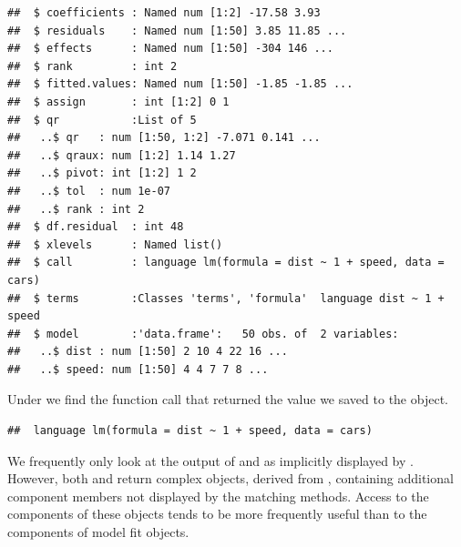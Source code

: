 \documentclass[krantz2]{krantz}\usepackage{knitr}
\begin{document}
\begin{explainbox}
\begin{knitrout}\footnotesize
{}\color{fgcolor}\begin{kframe}
\begin{alltt}
  \hlstd{=} \hlstd{,}  \hlstd{=} \hlstd{,}  \hlstd{=} \hlstd{)}
\end{alltt}
\begin{verbatim}
##  $ coefficients : Named num [1:2] -17.58 3.93
##  $ residuals    : Named num [1:50] 3.85 11.85 ...
##  $ effects      : Named num [1:50] -304 146 ...
##  $ rank         : int 2
##  $ fitted.values: Named num [1:50] -1.85 -1.85 ...
##  $ assign       : int [1:2] 0 1
##  $ qr           :List of 5
##   ..$ qr   : num [1:50, 1:2] -7.071 0.141 ...
##   ..$ qraux: num [1:2] 1.14 1.27
##   ..$ pivot: int [1:2] 1 2
##   ..$ tol  : num 1e-07
##   ..$ rank : int 2
##  $ df.residual  : int 48
##  $ xlevels      : Named list()
##  $ call         : language lm(formula = dist ~ 1 + speed, data = cars)
##  $ terms        :Classes 'terms', 'formula'  language dist ~ 1 + speed
##  $ model        :'data.frame':	50 obs. of  2 variables:
##   ..$ dist : num [1:50] 2 10 4 22 16 ...
##   ..$ speed: num [1:50] 4 4 7 7 8 ...
\end{verbatim}
\end{kframe}
\end{knitrout}

Under  we find the function call that returned the value we saved to the  object.

\begin{knitrout}\footnotesize
{}\color{fgcolor}\begin{kframe}
\begin{alltt}
\hlopt{$}
\end{alltt}
\begin{verbatim}
##  language lm(formula = dist ~ 1 + speed, data = cars)
\end{verbatim}
\end{kframe}
\end{knitrout}

We frequently only look at the output of  and  as implicitly displayed by . However, both  and  return complex objects, derived from , containing additional component members not displayed by the matching  methods. Access to the components of these objects tends to be more frequently useful than to the components of model fit objects.


\end{explainbox}
\end{document}
